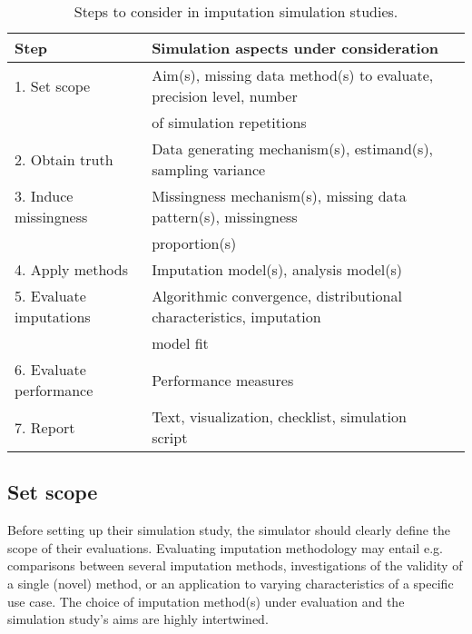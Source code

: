 \documentclass[bimj,fleqn]{w-art}
\begin{document}
\begin{table}[htb]
\begin{center}
\caption{Steps to consider in imputation simulation studies.}
\label{table:steps}
\begin{tabular}{lll}
\hline
Step                    & Simulation aspects under consideration \\
\hline  
1. Set scope            & Aim(s), missing data method(s) to evaluate, precision level, number \\
                        & of simulation repetitions \\
2. Obtain truth         & Data generating mechanism(s), estimand(s), sampling variance \\
3. Induce missingness   & Missingness mechanism(s), missing data pattern(s), missingness \\
                        & proportion(s) \\
4. Apply methods        & Imputation model(s), analysis model(s) \\
5. Evaluate imputations & Algorithmic convergence, distributional characteristics, imputation \\
                        & model fit \\
6. Evaluate performance & Performance measures \\
7. Report               & Text, visualization, checklist, simulation script \\
\hline
\end{tabular}
\end{center}
\end{table}



\subsection{Set scope}

Before setting up their simulation study, the simulator should clearly define the scope of their evaluations. Evaluating imputation methodology may entail e.g. comparisons between several imputation methods, investigations of the validity of a single (novel) method, or an application to varying characteristics of a specific use case. The choice of imputation method(s) under evaluation and the simulation study's aims are highly intertwined.
\end{document}
